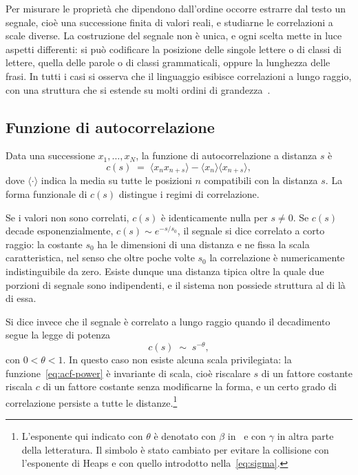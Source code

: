 Per misurare le proprietà che dipendono dall'ordine occorre estrarre dal testo
un segnale, cioè una successione finita di valori reali, e studiarne le
correlazioni a scale diverse. La costruzione del segnale non è unica, e ogni
scelta mette in luce aspetti differenti: si può codificare la posizione delle
singole lettere o di classi di lettere, quella delle parole o di classi
grammaticali, oppure la lunghezza delle frasi. In tutti i casi si osserva che il
linguaggio esibisce correlazioni a lungo raggio, con una struttura che si
estende su molti ordini di grandezza~\cite{altmann2012,montemurro2002}.

\subsection{Funzione di autocorrelazione}
\label{sec:acf}

Data una successione $x_1,\dots,x_N$, la funzione di autocorrelazione a distanza
$s$ è
\begin{equation}
  c(s) \;=\; \langle x_n x_{n+s}\rangle
  - \langle x_n\rangle\langle x_{n+s}\rangle ,
  \label{eq:acf}
\end{equation}
dove $\langle\cdot\rangle$ indica la media su tutte le posizioni $n$ compatibili
con la distanza $s$. La forma funzionale di $c(s)$ distingue i regimi di
correlazione.

Se i valori non sono correlati, $c(s)$ è identicamente nulla per $s \neq 0$. Se
$c(s)$ decade esponenzialmente,
$c(s) \sim e^{-s/s_0}$, il segnale si dice correlato a corto raggio: la costante
$s_0$ ha le dimensioni di una distanza e ne fissa la scala caratteristica, nel
senso che oltre poche volte $s_0$ la correlazione è numericamente
indistinguibile da zero. Esiste dunque una distanza tipica oltre la quale due
porzioni di segnale sono indipendenti, e il sistema non possiede struttura al di
là di essa.

Si dice invece che il segnale è correlato a lungo raggio quando il decadimento
segue la legge di potenza
\begin{equation}
  c(s) \;\sim\; s^{-\theta},
  \label{eq:acf-power}
\end{equation}
con $0<\theta<1$. In questo caso non esiste alcuna scala privilegiata: la
funzione~\eqref{eq:acf-power} è invariante di scala, cioè riscalare $s$ di un
fattore costante riscala $c$ di un fattore costante senza modificarne la forma,
e un certo grado di correlazione persiste a tutte le distanze.\footnote{L'esponente
qui indicato con $\theta$ è denotato con $\beta$ in~\cite{altmann2012} e con
$\gamma$ in altra parte della letteratura. Il simbolo è stato cambiato per
evitare la collisione con l'esponente di Heaps e con quello introdotto
nella~\eqref{eq:sigma}.}

